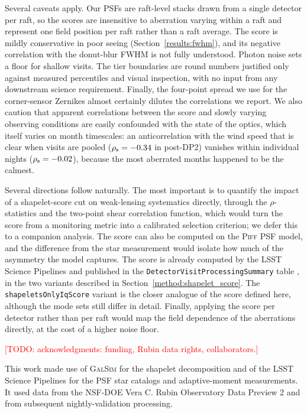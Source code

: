 \documentclass[]{spie}
\newcommand{\todo}[1]{\textcolor{red}{[TODO: #1]}}
\begin{document}
Several caveats apply. Our PSFs are raft-level stacks drawn from a single detector per raft,
so the scores are insensitive to aberration varying within a raft and represent one field
position per raft rather than a raft average. The score is mildly conservative in poor
seeing (Section~\ref{results:fwhm}), and its negative correlation with the donut-blur FWHM
is not fully understood. Photon noise sets a
floor for shallow visits. The tier boundaries are round numbers justified only against
measured percentiles and visual inspection, with no input from any downstream science
requirement. Finally, the four-point spread we use for the corner-sensor Zernikes almost
certainly dilutes the correlations we report. We also caution that apparent correlations
between the score and slowly varying observing conditions are easily confounded with the
state of the optics, which itself varies on month timescales: an anticorrelation with the
wind speed that is clear when visits are pooled ($\rho_{\rm s} = -0.34$ in post-DP2)
vanishes within individual nights ($\rho_{\rm s} = -0.02$), because the most aberrated
months happened to be the calmest.

Several directions follow naturally. The most important is to quantify the impact of a
shapelet-score cut on weak-lensing systematics directly, through the $\rho$-statistics and
the two-point shear correlation function, which would turn the score from a monitoring
metric into a calibrated selection criterion; we defer this to a companion analysis. The
score can also be computed on the \textsc{Piff} PSF model, and the difference from the
star measurement would isolate how much of the asymmetry the model captures. The score is
already computed by the LSST Science Pipelines and published in the
\texttt{DetectorVisitProcessingSummary} table \cite{SDMSchemas}, in the two variants
described in Section~\ref{method:shapelet_score}. The \texttt{shapeletsOnlyIqScore} variant
is the closer analogue of the score defined here, although the mode sets still differ in
detail. Finally, applying the score per detector rather than per raft would map
the field dependence of the aberrations directly, at the cost of a higher noise floor.


\acknowledgments

\todo{acknowledgments: funding, Rubin data rights, collaborators.}

This work made use of \textsc{GalSim} \cite{Rowe2015} for the shapelet decomposition and of
the LSST Science Pipelines for the PSF star catalogs and adaptive-moment measurements. It
used data from the NSF-DOE Vera C. Rubin Observatory Data Preview 2 \cite{DP2} and from
subsequent nightly-validation processing.



\end{document}
